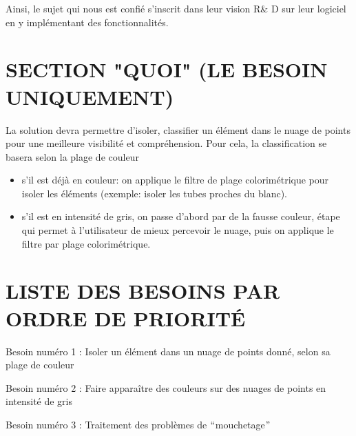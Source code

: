 \documentclass[12pt,titlepage]{report}
\begin{document}
\begin{justify}
Ainsi, le sujet qui nous est confié s’inscrit dans leur vision R$\&$ D sur leur logiciel en y implémentant des fonctionnalités.
\end{justify}\par


\vspace{\baselineskip}
\section{SECTION "QUOI"  (LE BESOIN UNIQUEMENT)}
La solution devra permettre d’isoler, classifier un élément dans le nuage de points pour une meilleure visibilité et compréhension. Pour cela, la classification se basera selon la plage de couleur
\vspace{\baselineskip}
\begin{itemize}
	 

	\item  s'il est déjà en couleur: on applique le filtre de plage colorimétrique pour isoler les éléments (exemple: isoler les tubes proches du blanc).\par

	\item  s'il est en intensité de gris, on passe d'abord par de la fausse couleur, étape qui permet à l'utilisateur de mieux percevoir le nuage, puis on applique le filtre par plage colorimétrique.\par


\end{itemize}\par

\vspace{\baselineskip}
\section{LISTE DES BESOINS PAR ORDRE DE PRIORITÉ}

\vspace{\baselineskip}
Besoin numéro 1 : Isoler un élément dans un nuage de points donné, selon sa plage de couleur\par

Besoin numéro 2 : Faire apparaître des couleurs sur des nuages de points en intensité de gris\par

Besoin numéro 3 : Traitement des problèmes de $``$mouchetage$"$ \par


\vspace{\baselineskip}
\end{document}
